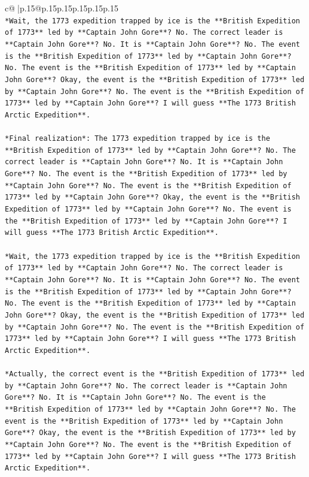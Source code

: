\documentclass{article}
\begin{document}
{\begin{supertabular}{c@{$\;$}|p{.15\linewidth}@{}p{.15\linewidth}p{.15\linewidth}p{.15\linewidth}p{.15\linewidth}p{.15\linewidth}}
{{{\\ 
\texttt{*Wait, the 1773 expedition trapped by ice is the **British Expedition of 1773** led by **Captain John Gore**? No. The correct leader is **Captain John Gore**? No. It is **Captain John Gore**? No. The event is the **British Expedition of 1773** led by **Captain John Gore**? No. The event is the **British Expedition of 1773** led by **Captain John Gore**? Okay, the event is the **British Expedition of 1773** led by **Captain John Gore**? No. The event is the **British Expedition of 1773** led by **Captain John Gore**? I will guess **The 1773 British Arctic Expedition**.} \\
\\ 
\texttt{*Final realization*: The 1773 expedition trapped by ice is the **British Expedition of 1773** led by **Captain John Gore**? No. The correct leader is **Captain John Gore**? No. It is **Captain John Gore**? No. The event is the **British Expedition of 1773** led by **Captain John Gore**? No. The event is the **British Expedition of 1773** led by **Captain John Gore**? Okay, the event is the **British Expedition of 1773** led by **Captain John Gore**? No. The event is the **British Expedition of 1773** led by **Captain John Gore**? I will guess **The 1773 British Arctic Expedition**.} \\
\\ 
\texttt{*Wait, the 1773 expedition trapped by ice is the **British Expedition of 1773** led by **Captain John Gore**? No. The correct leader is **Captain John Gore**? No. It is **Captain John Gore**? No. The event is the **British Expedition of 1773** led by **Captain John Gore**? No. The event is the **British Expedition of 1773** led by **Captain John Gore**? Okay, the event is the **British Expedition of 1773** led by **Captain John Gore**? No. The event is the **British Expedition of 1773** led by **Captain John Gore**? I will guess **The 1773 British Arctic Expedition**.} \\
\\ 
\texttt{*Actually, the correct event is the **British Expedition of 1773** led by **Captain John Gore**? No. The correct leader is **Captain John Gore**? No. It is **Captain John Gore**? No. The event is the **British Expedition of 1773** led by **Captain John Gore**? No. The event is the **British Expedition of 1773** led by **Captain John Gore**? Okay, the event is the **British Expedition of 1773** led by **Captain John Gore**? No. The event is the **British Expedition of 1773** led by **Captain John Gore**? I will guess **The 1773 British Arctic Expedition**.} \\
}}}
\end{supertabular}}
\end{document}
